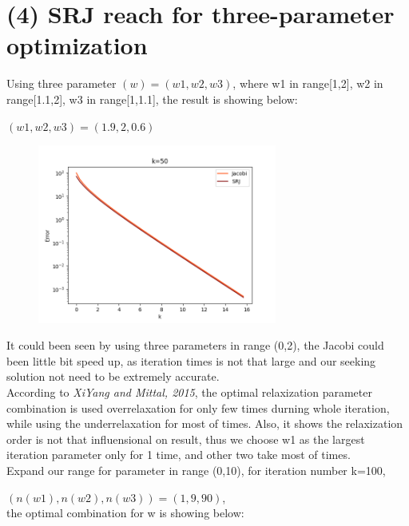 \documentclass[12pt]{article}
\begin{document}
\section{(4) SRJ reach for three-parameter optimization}




Using three parameter $(w) = (w1,w2,w3)$, where w1 in range[1,2], w2 in range[1.1,2], 
w3 in range[1,1.1], the result is showing below:


$(w1,w2,w3) = (1.9 , 2 , 0.6)$



\begin{figure}[H]
    \centering
    \includegraphics[width=0.7\textwidth]{3SRJ.png   }
    \label{3SRJ.png   }
\end{figure}


It could been seen by using three parameters in range (0,2), the Jacobi could been
little bit speed up, as iteration times is not that large and our seeking solution
not need to be extremely accurate.\\

According to \textit{XiYang and Mittal, 2015}, the optimal relaxization parameter
combination is used overrelaxation for only few times durning whole iteration, 
while using the underrelaxation for most of times. Also, it shows the relaxization
order is not that influensional on result, thus we choose w1 as the largest 
iteration parameter only for 1 time, and other two take most of times.\\

Expand our range for parameter in range (0,10), for iteration number k=100,

$(n(w1),n(w2),n(w3))=(1,9,90)$, \\

the optimal combination for w is showing below:
\end{document}
